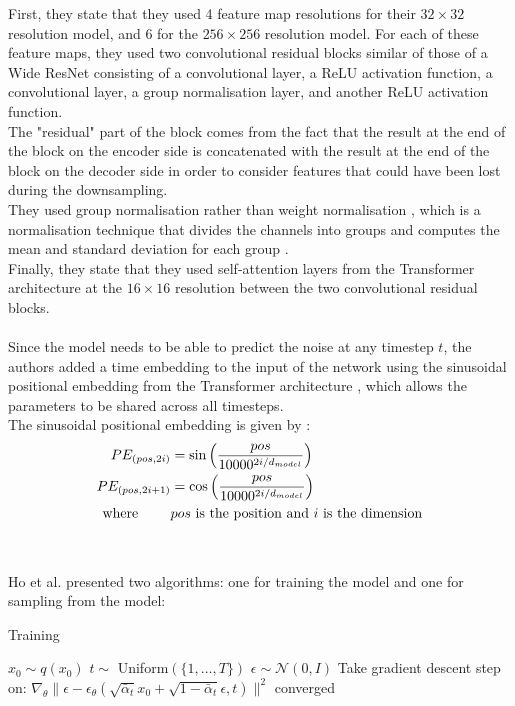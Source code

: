 \documentclass{article}
\begin{document}
First, they state that they used 4 feature map resolutions for their $32 \times 32$ resolution model, and 6 for the $256 \times 256$ resolution model. For each of these feature maps, they used two convolutional residual blocks similar of those of a Wide ResNet \cite{zagoruyko2017wide} consisting of a convolutional layer, a ReLU activation function, a convolutional layer, a group normalisation layer, and another ReLU activation function. \\ 
The "residual" part of the block comes from the fact that the result at the end of the block on the encoder side is concatenated with the result at the end of the block on the decoder side in order to consider features that could have been lost during the downsampling. \cite{lai2022rethinking} \\
They used group normalisation \cite{wu2018group} rather than weight normalisation \cite{salimans2016weight}, which is a normalisation technique that divides the channels into groups and computes the mean and standard deviation for each group \cite{ho2020denoising}. \\
Finally, they state that they used self-attention layers from the Transformer architecture \cite{vaswani2023attention} at the $16 \times 16$ resolution between the two convolutional residual blocks. \cite{ho2020denoising}
\\\\
Since the model needs to be able to predict the noise at any timestep $t$, the authors added a time embedding to the input of the network using the sinusoidal positional embedding from the Transformer architecture \cite{vaswani2023attention}, which allows the parameters to be shared across all timesteps. \\
The sinusoidal positional embedding is given by \cite{vaswani2023attention}:
\begin{align}
  PE_{(pos, 2i)} &= \sin \left( \frac{pos}{10000^{2i/d_{model}}} \right) \\
  PE_{(pos, 2i+1)} &= \cos \left( \frac{pos}{10000^{2i/d_{model}}} \right) \\
  \text{where } \qquad & pos \text{ is the position and } i \text{ is the dimension} \notag
\end{align}
\\\\
Ho et al. \cite{ho2020denoising} presented two algorithms: one for training the model and one for sampling from the model:
\\
\begin{minipage}{0.49\textwidth}
  \begin{algorithm}[H]
    \centering
    \caption{Training}\label{alg:training}
    \begin{algorithmic}[1]
      \Repeat
      \State $x_0 \sim q(x_0)$
      \State $t \sim$ Uniform$(\{1,\ldots, T\})$
      \State $\epsilon \sim \mathcal{N}(0, I)$
      \State Take gradient descent step on:
      \State \quad $\nabla_\theta \| \epsilon - \epsilon_\theta \left( \sqrt{\bar{\alpha}_t} x_0 + \sqrt{1 - \bar{\alpha}_t} \epsilon, t \right) \|^2$
      \Until converged
    \end{algorithmic}
  \end{algorithm}
\end{minipage}
\end{document}
